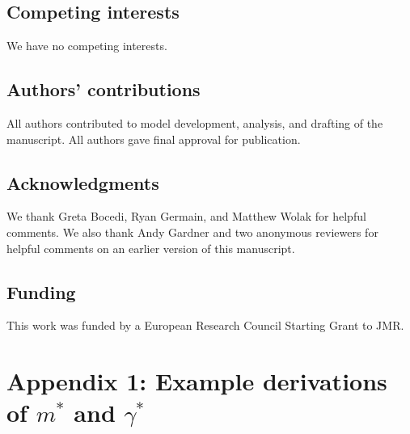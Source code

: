 \documentclass[12pt]{article}
\begin{document}



\subsection*{Competing interests}

We have no competing interests.

\subsection*{Authors' contributions}

All authors contributed to model development, analysis, and drafting of the manuscript. All authors gave final approval for publication. 

\subsection*{Acknowledgments}

We thank Greta Bocedi, Ryan Germain, and Matthew Wolak for helpful comments. We also thank Andy Gardner and two anonymous reviewers for helpful comments on an earlier version of this manuscript.

\subsection*{Funding}

This work was funded by a European Research Council Starting Grant to JMR.

\section*{Appendix 1: Example derivations of $m^{*}$ and $\gamma^{*}$}
\end{document}
